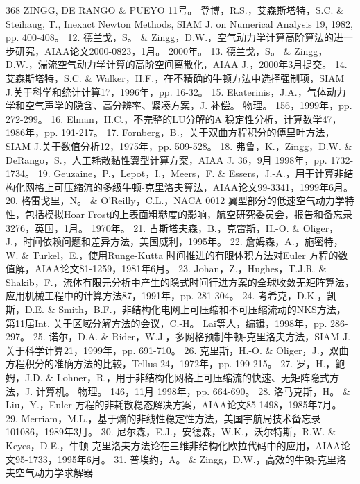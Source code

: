 \documentclass[UTF8,11pt,a4paper,openany,fontset=fandol]{ctexbook}
\begin{document}
368 ZINGG, DE RANGO \& PUEYO 11号。 登博，R.S.，艾森斯塔特，S.C. \& Steihaug, T., Inexact Newton Methods, SIAM J. on Numerical Analysis 19, 1982, pp. 400-408。 12. 德兰戈，S。 \& Zingg，D.W.，空气动力学计算高阶算法的进一步研究，AIAA论文2000-0823，1月。 2000年。 13. 德兰戈，S。 \& Zingg，D.W.，湍流空气动力学计算的高阶空间离散化，AIAA J.，2000年3月提交。 14. 艾森斯塔特，S.C. \& Walker，H.F.，在不精确的牛顿方法中选择强制项，SIAM J.关于科学和统计计算17，1996年，pp. 16-32。 15. Ekaterinis，J.A.，气体动力学和空气声学的隐含、高分辨率、紧凑方案，J. 补偿。 物理。 156，1999年，pp. 272-299。 16. Elman，H.C.，不完整的LU分解的A 稳定性分析，计算数学47，1986年，pp. 191-217。 17. Fornberg，B.，关于双曲方程积分的傅里叶方法，SIAM J.关于数值分析12，1975年，pp. 509-528。 18. 弗鲁，K.，Zingg，D.W. \& DeRango，S.，人工耗散黏性翼型计算方案，AIAA J. 36，9月 1998年，pp. 1732-1734。 19. Geuzaine，P.，Lepot，I.，Meers，F. \& Essers，J.-A.，用于计算非结构化网格上可压缩流的多级牛顿-克里洛夫算法，AIAA论文99-3341，1999年6月。 20. 格雷戈里，N。 \& O'Reilly，C.L.，NACA 0012 翼型部分的低速空气动力学特性，包括模拟Hoar Frost的上表面粗糙度的影响，航空研究委员会，报告和备忘录3276，英国，1月。 1970年。 21. 古斯塔夫森，B.，克雷斯，H.-O. \& Oliger，J.，时间依赖问题和差异方法，美国威利，1995年。 22. 詹姆森，A.，施密特，W. \& Turkel，E.，使用Runge-Kutta 时间推进的有限体积方法对Euler 方程的数值解，AIAA论文81-1259，1981年6月。 23. Johan，Z.，Hughes，T.J.R. \& Shakib，F.，流体有限元分析中产生的隐式时间行进方案的全球收敛无矩阵算法，应用机械工程中的计算方法87，1991年，pp. 281-304。 24. 考希克，D.K.，凯斯，D.E. \& Smith，B.F.，非结构化电网上可压缩和不可压缩流动的NKS方法，第11届Int. 关于区域分解方法的会议，C.-H。 Lai等人，编辑，1998年，pp. 286-297。 25. 诺尔，D.A. \& Rider，W.J.，多网格预制牛顿-克里洛夫方法，SIAM J.关于科学计算21，1999年，pp. 691-710。 26. 克里斯，H.-O. \& Oliger，J.，双曲方程积分的准确方法的比较，Tellus 24，1972年，pp. 199-215。 27. 罗，H.，鲍姆，J.D. \& Lohner，R.，用于非结构化网格上可压缩流的快速、无矩阵隐式方法，J. 计算机。 物理。 146，11月 1998年，pp. 664-690。 28. 洛马克斯，H。 \& Liu，Y.，Euler 方程的非耗散稳态解决方案，AIAA论文85-1498，1985年7月。 29. Merriam，M.L.，基于熵的非线性稳定性方法，美国宇航局技术备忘录101086，1989年3月。 30. 尼尔森，E.J.，安德森，W.K.，沃尔特斯，R.W. \& Keyes，D.E.，牛顿-克里洛夫方法论在三维非结构化欧拉代码中的应用，AIAA论文95-1733，1995年6月。 31. 普埃约，A。 \& Zingg，D.W.，高效的牛顿-克里洛夫空气动力学求解器
\end{document}
